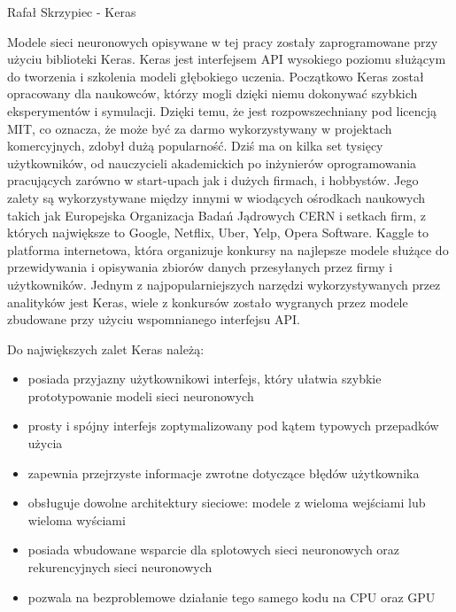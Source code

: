 \documentclass[]{article}
\author{Rafa\l \vspace{1cm} Skrzypiec}
\theoremstyle{definition}
\begin{document}

{\large Rafał Skrzypiec - Keras}
\vspace{1cm}

Modele sieci neuronowych opisywane w tej pracy zostały zaprogramowane przy użyciu biblioteki Keras. Keras jest interfejsem API wysokiego poziomu służącym do tworzenia i szkolenia modeli głębokiego uczenia. Początkowo Keras został opracowany dla naukowców, którzy mogli dzięki niemu dokonywać szybkich eksperymentów i symulacji. Dzięki temu, że jest rozpowszechniany pod licencją MIT, co oznacza, że może być za darmo wykorzystywany w projektach komercyjnych, zdobył dużą popularność. Dziś ma on kilka set tysięcy użytkowników, od nauczycieli akademickich po inżynierów oprogramowania pracujących zarówno w start-upach jak i dużych firmach, i hobbystów. Jego zalety są wykorzystywane między innymi w wiodących ośrodkach naukowych takich jak Europejska Organizacja Badań Jądrowych CERN i setkach firm, z których największe to Google, Netflix, Uber, Yelp, Opera Software. Kaggle to platforma internetowa, która organizuje konkursy na najlepsze modele służące do przewidywania i opisywania zbiorów danych przesyłanych przez firmy i użytkowników. Jednym z najpopularniejszych narzędzi wykorzystywanych przez analityków jest Keras, wiele z konkursów zostało wygranych przez modele zbudowane przy użyciu wspomnianego interfejsu API.

Do największych zalet Keras należą:
\begin{itemize}
\setlength\itemsep{0.em}

\item  posiada przyjazny użytkownikowi interfejs, który ułatwia szybkie prototypowanie modeli sieci neuronowych
\item  prosty i spójny interfejs zoptymalizowany pod kątem typowych przepadków użycia
\item  zapewnia przejrzyste informacje zwrotne dotyczące błędów użytkownika
\item  obsługuje dowolne architektury sieciowe: modele z wieloma wejściami lub wieloma wyściami
\item posiada wbudowane wsparcie dla splotowych sieci neuronowych oraz rekurencyjnych sieci neuronowych
\item  pozwala na bezproblemowe działanie tego samego kodu na CPU oraz GPU
\end{itemize}
\end{document}
